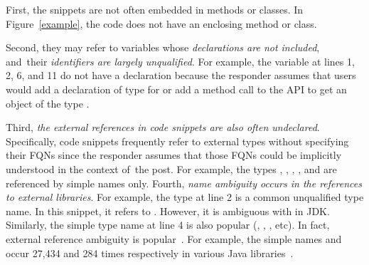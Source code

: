First, the snippets are not often embedded in methods or classes. In
Figure~\ref{example}, the code does not have an enclosing method or
class.

Second, they may refer to variables whose {\em declarations are not
  included}, and~their {\em identifiers are largely unqualified}. For
example, the variable  at lines 1, 2, 6, and 11 do not
have a declaration because the responder assumes that users would add
a declaration of type  for  or add a
method call to the API  to get an object of
the type .
%
%

Third, {\em the external references in code snippets are also often
  undeclared}. Specifically, code snippets frequently refer to
external types without specifying their FQNs since the
responder assumes that those FQNs could be implicitly understood in
the context of~the post.
%
%
%
For example, the types , ,
, , and  are
referenced by simple names only. Fourth, {\em name ambiguity occurs in
  the references to external libraries}. For example, the type
 at line 2 is a common unqualified type name. In
this snippet, it refers to
. However, it is
ambiguous with  in JDK. Similarly, the
simple type name  at line 4 is also popular
(,
, ,
etc).
In fact, external reference ambiguity is
popular~\cite{dagenais-icse12}.
%
For example, the simple names  and  occur 27,434
and 284 times respectively in various Java libraries~\cite{liveapi14}.


